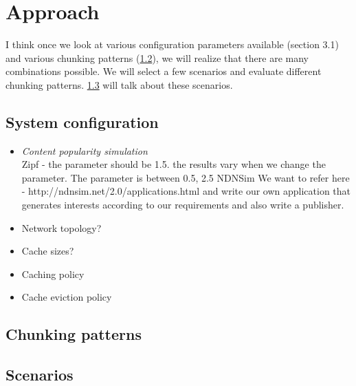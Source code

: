 \section{Approach} \label{sec:approach}
I think once we look at various configuration parameters available
(section 3.1) and various chunking patterns (\ref{sec:patterns}), we
will realize that there are many combinations possible. We will select
a few scenarios and evaluate different chunking
patterns. \ref{sec:scenarios} will talk about these scenarios.

\subsection{System configuration} \label{sec:config}
\begin{itemize}
  \item \emph{Content popularity simulation} \\ Zipf - the parameter
    should be 1.5. the results vary when we change the parameter. The
    parameter is between {0.5, 2.5} NDNSim We want to refer here -
    http://ndnsim.net/2.0/applications.html and write our own
    application that generates interests according to our requirements
    and also write a publisher.

  \item Network topology?
  \item Cache sizes?
  \item Caching policy
  \item Cache eviction policy
\end{itemize}

\subsection{Chunking patterns} \label{sec:patterns}
\subsection{Scenarios} \label{sec:scenarios}
